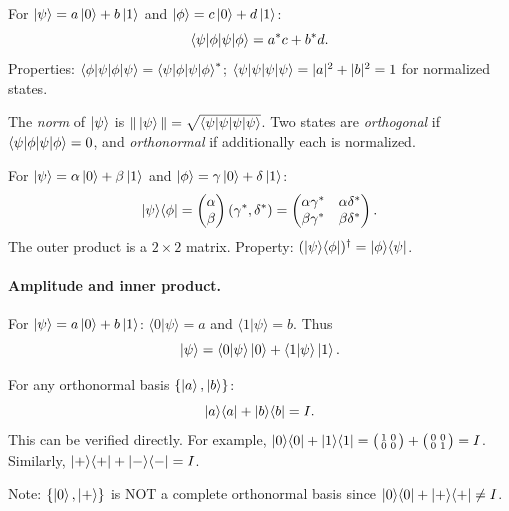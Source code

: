 \documentclass[10pt,a4paper]{article}
\begin{document}
\begin{tcolorbox}[defstyle, title={Definition: Inner Product}]
For $\ket{\psi}=a\ket{0}+b\ket{1}$ and $\ket{\phi}=c\ket{0}+d\ket{1}$:
\[
\braket{\psi|\phi} = a^*c + b^*d.
\]
Properties: $\braket{\phi|\psi}=\braket{\psi|\phi}^*$; $\braket{\psi|\psi}=|a|^2+|b|^2=1$ for normalized states.
\end{tcolorbox}

The \emph{norm} of $\ket{\psi}$ is $\|\ket{\psi}\|=\sqrt{\braket{\psi|\psi}}$. Two states are \emph{orthogonal} if $\braket{\psi|\phi}=0$, and \emph{orthonormal} if additionally each is normalized.

\begin{tcolorbox}[defstyle, title={Definition: Outer Product}]
For $\ket{\psi}=\alpha\ket{0}+\beta\ket{1}$ and $\ket{\phi}=\gamma\ket{0}+\delta\ket{1}$:
\[
\ket{\psi}\!\bra{\phi} = \begin{pmatrix}\alpha\\\beta\end{pmatrix}(\gamma^*,\delta^*) = \begin{pmatrix}\alpha\gamma^* & \alpha\delta^* \\ \beta\gamma^* & \beta\delta^*\end{pmatrix}.
\]
The outer product is a $2\times 2$ matrix. Property: $(\ket{\psi}\!\bra{\phi})^\dagger = \ket{\phi}\!\bra{\psi}$.
\end{tcolorbox}

\paragraph{Amplitude and inner product.}
For $\ket{\psi}=a\ket{0}+b\ket{1}$:
$\langle 0|\psi\rangle=a$ and $\langle 1|\psi\rangle=b$.
Thus
\[
\ket{\psi}
=
\langle 0|\psi\rangle\ket{0}
+
\langle 1|\psi\rangle\ket{1}.
\]

\begin{tcolorbox}[propstyle, title={Completeness Relation}]
For any orthonormal basis $\{\ket{a},\ket{b}\}$:
\[
\ket{a}\!\bra{a} + \ket{b}\!\bra{b} = I.
\]
This can be verified directly. For example, $\ket{0}\!\bra{0}+\ket{1}\!\bra{1}=\bigl(\begin{smallmatrix}1&0\\0&0\end{smallmatrix}\bigr)+\bigl(\begin{smallmatrix}0&0\\0&1\end{smallmatrix}\bigr)=I$. Similarly, $\ket{+}\!\bra{+}+\ket{-}\!\bra{-}=I$.

Note: $\{\ket{0},\ket{+}\}$ is NOT a complete orthonormal basis since $\ket{0}\!\bra{0}+\ket{+}\!\bra{+}\neq I$.
\end{tcolorbox}
\end{document}
